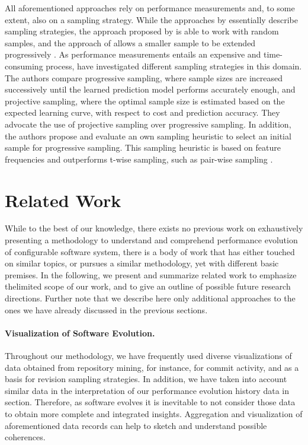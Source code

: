 All aforementioned approaches rely on performance measurements and, to
some extent, also on a  sampling strategy. While the approaches by
\cite{siegmund_predicting_2012,siegmund_performance-influence_2015} essentially describe sampling strategies,
the approach proposed by \cite{zhang_performance_2015} is able to work with random samples, and the
approach of \cite{guo_variability-aware_2013} allows a smaller sample to be
extended progressively \citep{guo_variability-aware_2013}.
As performance measurements entails an expensive and time-consuming process,
\cite{sarkar_cost-efficient_2015} have investigated different sampling
strategies in this domain.
The authors compare progressive sampling, where sample sizes are increased
successively until the learned prediction model performs accurately enough, and projective
sampling, where the optimal sample size is estimated based on the expected
learning curve, with respect to cost and prediction accuracy. They advocate the
use of projective sampling over progressive sampling. In addition, the authors
propose and evaluate an own sampling heuristic to select an initial sample for
progressive sampling. This sampling heuristic is based on feature frequencies
and outperforms t-wise sampling, such as pair-wise sampling
\citep{sarkar_cost-efficient_2015}.

\section{Related Work}\label{sec:relatedwork}
While to the best of our knowledge, there exists no previous work on
exhaustively presenting a methodology to understand and comprehend performance
evolution of configurable software system, there is a body of work that has
either touched on similar topics, or pursues a similar methodology, yet with
different basic premises. In the following, we present and summarize related
work to emphasize thelimited scope of our work, and to give an outline of
possible future research directions. Further note that we describe here only
additional approaches to the ones we have already discussed in the previous
sections.

\paragraph{Visualization of Software Evolution.}
Throughout our methodology, we have frequently used diverse visualizations of
data obtained from repository mining, for instance, for commit activity, and as
a basis for revision sampling strategies. In addition, we have taken into
account similar data in the interpretation of our performance evolution history
data in section. Therefore, as software evolves it is inevitable to not
consider those data to obtain more complete and integrated insights.
Aggregation and visualization of aforementioned data records can help to sketch
and understand possible coherences.

